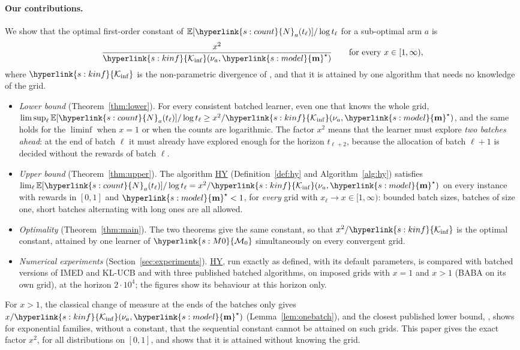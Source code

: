 \documentclass[10pt]{article}
\newcommand{\sy}[2]{{\hyperlink{#1}{#2}}}
\newcommand{\E}{\mathbb{E}}
\newcommand{\1}{\mathbf{1}}
\newcommand{\m}{\sy{s:model}{\mathbf{m}}}
\newcommand{\Ki}{\sy{s:kinf}{\mathcal K_{\inf}}}
\newcommand{\Ng}{\sy{s:count}{N}}
\newcommand{\Mz}{\sy{s:M0}{\mathcal M_0}}
\newcommand{\HY}{\hyperref[def:hy]{\textup{HY}}}
\begin{document}
\paragraph{Our contributions.} We show that the optimal first-order constant of $\E[\Ng_a(t_\ell)]/\log t_\ell$ for a sub-optimal arm $a$ is
\[
\frac{x^2}{\Ki(\nu_a,\m^\star)}\qquad\text{for every }x\in[1,\infty),
\]
where $\Ki$ is the non-parametric divergence of \citet{HT10}, and that it is attained by one algorithm that needs no knowledge of the grid.
\begin{itemize}[leftmargin=*]
\item \emph{Lower bound} (Theorem~\ref{thm:lower}). For every consistent batched learner, even one that knows the whole grid, $\limsup_\ell\E[\Ng_a(t_\ell)]/\log t_\ell\ge x^2/\Ki(\nu_a,\m^\star)$,
and the same holds for the $\liminf$ when $x=1$ or when the counts are logarithmic. The factor $x^2$ means that the learner must explore \emph{two batches ahead}: at
the end of batch $\ell$ it must already have explored enough for the horizon $t_{\ell+2}$, because the allocation of batch $\ell+1$ is decided without the rewards of
batch $\ell$.
\item \emph{Upper bound} (Theorem~\ref{thm:upper}). The algorithm \HY{} (Definition~\ref{def:hy} and Algorithm~\ref{alg:hy}) satisfies $\lim_\ell\E[\Ng_a(t_\ell)]/\log t_\ell=x^2/\Ki(\nu_a,\m^\star)$ on
every instance with rewards in $[0,1]$ and $\m^\star<1$, for \emph{every} grid with $x_\ell\to x\in[1,\infty)$: bounded batch sizes, batches of size one, short batches
alternating with long ones are all allowed.
\item \emph{Optimality} (Theorem~\ref{thm:main}). The two theorems give the same constant, so that $x^2/\Ki$ is the optimal constant, attained by one learner of $\Mz$
simultaneously on every convergent grid.
\item \emph{Numerical experiments} (Section~\ref{sec:experiments}). \HY, run exactly as defined, with its default parameters, is compared with
batched versions of IMED and KL-UCB and with three published batched algorithms, on imposed grids with $x=1$ and $x>1$ (BABA on its own grid), at the horizon
$2\cdot10^4$; the figures show its behaviour at this horizon only.
\end{itemize}
For $x>1$, the classical change of measure at the ends of the batches only gives $x/\Ki(\nu_a,\m^\star)$ (Lemma~\ref{lem:onebatch}), and the closest published lower
bound, \citet[Theorem~4]{JTXHXG21}, shows for exponential families, without a constant, that the sequential constant cannot be attained on such grids. This
paper gives the exact factor $x^2$, for all distributions on $[0,1]$, and shows that it is attained without knowing the grid.
\end{document}
